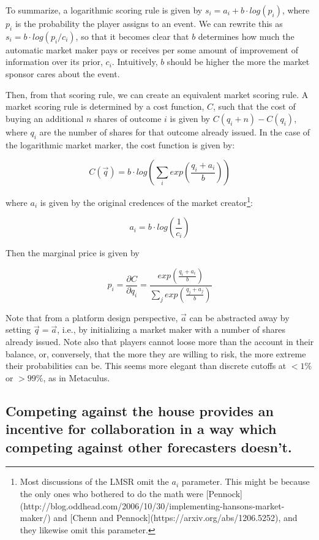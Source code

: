 \documentclass[]{article}
\begin{document}
To summarize, a logarithmic scoring rule is given by
\(s_i = a_i + b\cdot log(p_i)\), where \(p_i\) is the probability the
player assigns to an event. We can rewrite this as
\(s_i = b \cdot log(p_i / c_i)\), so that it becomes clear that \(b\)
determines how much the automatic market maker pays or receives per some
amount of improvement of information over its prior, \(c_i\).
Intuitively, \(b\) should be higher the more the market sponsor cares
about the event.

Then, from that scoring rule, we can create an equivalent market scoring
rule. A market scoring rule is determined by a cost function, \(C\),
such that the cost of buying an additional \(n\) shares of outcome \(i\)
is given by \(C(q_i + n)-C(q_i)\), where \(q_i\) are the number of
shares for that outcome already issued. In the case of the logarithmic
market marker, the cost function is given by:

\[C(\vec{q}) = b \cdot log\left( \sum_i{exp\left(\frac{q_i + a_i}{b}\right)}\right)\]

where \(a_i\) is given by the original credences of the market
creator\footnote{Most discussions of the LMSR omit the $a_i$ parameter. This might be because the only ones who bothered to do the math were [Pennock](http://blog.oddhead.com/2006/10/30/implementing-hansons-market-maker/) and [Chenn and Pennock](https://arxiv.org/abs/1206.5252), and they likewise omit this parameter.}:

\[a_i = b \cdot log\left(\frac{1}{c_i}\right)\]

Then the marginal price is given by

\[p_i = \frac{\partial C}{\partial q_i} = \frac{exp\left(\frac{q_i + a_i}{b}\right)}{\sum_j{exp\left(\frac{q_j + a_j}{b}\right)}}\]

Note that from a platform design perspective, \(\vec{a}\) can be
abstracted away by setting \(\vec{q}=\vec{a}\), i.e., by initializing a
market maker with a number of shares already issued. Note also that
players cannot loose more than the account in their balance, or,
conversely, that the more they are willing to risk, the more extreme
their probabilities can be. This seems more elegant than discrete
cutoffs at \(<1\%\) or \(>99\%\), as in Metaculus.

\hypertarget{competing-against-the-house-provides-an-incentive-for-collaboration-in-a-way-which-competing-against-other-forecasters-doesnt.}{%
\subsection{Competing against the house provides an incentive for
collaboration in a way which competing against other forecasters
doesn't.}\label{competing-against-the-house-provides-an-incentive-for-collaboration-in-a-way-which-competing-against-other-forecasters-doesnt.}}
\end{document}
